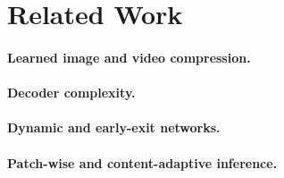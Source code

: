 \section{Related Work}
\label{sec:related}

\paragraph{Learned image and video compression.}

\paragraph{Decoder complexity.}

\paragraph{Dynamic and early-exit networks.}

\paragraph{Patch-wise and content-adaptive inference.}
